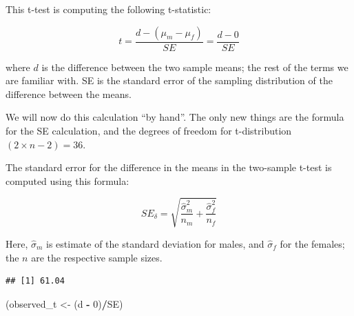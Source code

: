 \documentclass[12pt,]{krantz}
\newenvironment{Shaded}{\begin{snugshade}}{\end{snugshade}}
\newcommand{\CommentTok}[1]{\textcolor[rgb]{0.56,0.35,0.01}{\textit{#1}}}
\newcommand{\DecValTok}[1]{\textcolor[rgb]{0.00,0.00,0.81}{#1}}
\newcommand{\KeywordTok}[1]{\textcolor[rgb]{0.13,0.29,0.53}{\textbf{#1}}}
\newcommand{\NormalTok}[1]{#1}
\newcommand{\OperatorTok}[1]{\textcolor[rgb]{0.81,0.36,0.00}{\textbf{#1}}}
\newcommand{\StringTok}[1]{\textcolor[rgb]{0.31,0.60,0.02}{#1}}
\begin{document}
This t-test is computing the following t-statistic:

\begin{equation}
t=\frac{d-(\mu_m - \mu_f)}{SE} = \frac{d-0}{SE} 
\end{equation}

\noindent 
where \(d\) is the difference between the two sample means; the rest of the terms we are familiar with. SE is the standard error of the sampling distribution of the difference between the means.

We will now do this calculation ``by hand''. The only new things are the formula for the SE calculation, and the degrees of freedom for t-distribution \((2\times n - 2)=36\).

The standard error for the difference in the means in the two-sample t-test is computed using this formula:

\begin{equation}
SE_\delta 
= \sqrt{\frac{\hat\sigma_m^2}{n_m} + \frac{\hat\sigma_f^2}{n_f}}
\end{equation}

Here, \(\hat\sigma_m\) is estimate of the standard deviation for males, and \(\hat\sigma_f\) for the females; the \(n\) are the respective sample sizes.

\begin{Shaded}
\end{Shaded}

\begin{verbatim}
## [1] 61.04
\end{verbatim}

\begin{Shaded}
\begin{Highlighting}[]
\NormalTok{(observed_t <-}\StringTok{ }\NormalTok{(d }\OperatorTok{-}\StringTok{ }\DecValTok{0}\NormalTok{)}\OperatorTok{/}\NormalTok{SE)}
\end{Highlighting}
\end{Shaded}
\end{document}
